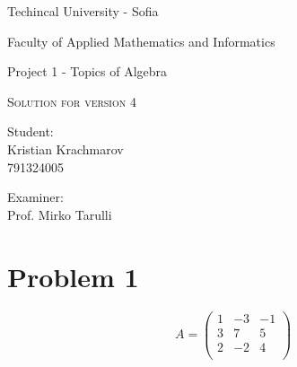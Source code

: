 \documentclass[a4paper,fleqn,12pt]{article}
\begin{document}
\begin{titlepage}
	\setlength{\parindent}{0pt}
	\large
\centering
Techincal University - Sofia \par
Faculty of Applied Mathematics and Informatics \par
\vspace{2cm}

{\huge Project 1 - Topics of Algebra\par}

\vspace{2cm}

\vspace{1cm}
{\LARGE\scshape  Solution for version 4 \par}



\vfill

\begin{minipage}[t]{.5\linewidth}
	Student: \\
	Kristian Krachmarov \\
	791324005
\end{minipage}%
\begin{minipage}[t]{.5\linewidth}
	\raggedleft
	Examiner:\\
	Prof. Mirko Tarulli
\end{minipage}

\vspace{2cm}
\raggedright

\end{titlepage}
\tableofcontents
\newpage
{}
\newpage


\newpage

\section{Problem 1}
$$ A = 
	\begin{pmatrix}
	1 & -3 & -1 \\
	3 & 7 & 5 \\
	2 & -2 & 4 \\
	\end{pmatrix}
$$
\end{document}
